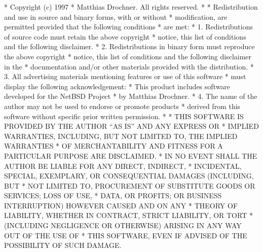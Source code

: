 \begin{copyrightEnv}
 * Copyright (c) 1997
 *	Matthias Drochner.  All rights reserved.
 *
 * Redistribution and use in source and binary forms, with or without
 * modification, are permitted provided that the following conditions
 * are met:
 * 1. Redistributions of source code must retain the above copyright
 *    notice, this list of conditions and the following disclaimer.
 * 2. Redistributions in binary form must reproduce the above copyright
 *    notice, this list of conditions and the following disclaimer in the
 *    documentation and/or other materials provided with the distribution.
 * 3. All advertising materials mentioning features or use of this software
 *    must display the following acknowledgement:
 *	This product includes software developed for the NetBSD Project
 *	by Matthias Drochner.
 * 4. The name of the author may not be used to endorse or promote products
 *    derived from this software without specific prior written permission.
 *
 * THIS SOFTWARE IS PROVIDED BY THE AUTHOR ``AS IS'' AND ANY EXPRESS OR
 * IMPLIED WARRANTIES, INCLUDING, BUT NOT LIMITED TO, THE IMPLIED WARRANTIES
 * OF MERCHANTABILITY AND FITNESS FOR A PARTICULAR PURPOSE ARE DISCLAIMED.
 * IN NO EVENT SHALL THE AUTHOR BE LIABLE FOR ANY DIRECT, INDIRECT,
 * INCIDENTAL, SPECIAL, EXEMPLARY, OR CONSEQUENTIAL DAMAGES (INCLUDING, BUT
 * NOT LIMITED TO, PROCUREMENT OF SUBSTITUTE GOODS OR SERVICES; LOSS OF USE,
 * DATA, OR PROFITS; OR BUSINESS INTERRUPTION) HOWEVER CAUSED AND ON ANY
 * THEORY OF LIABILITY, WHETHER IN CONTRACT, STRICT LIABILITY, OR TORT
 * (INCLUDING NEGLIGENCE OR OTHERWISE) ARISING IN ANY WAY OUT OF THE USE OF
 * THIS SOFTWARE, EVEN IF ADVISED OF THE POSSIBILITY OF SUCH DAMAGE.
\end{copyrightEnv}


